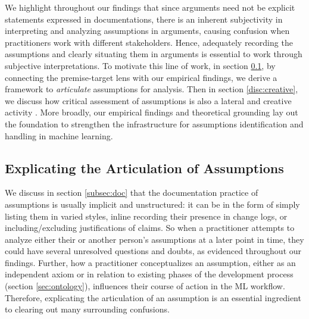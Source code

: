 We highlight throughout our findings that since arguments need not be explicit statements expressed in documentations, there is an inherent subjectivity in interpreting and analyzing assumptions in arguments, causing confusion when practitioners work with different stakeholders. Hence, adequately recording the assumptions and clearly situating them in arguments is essential to work through subjective interpretations. To motivate this line of work, in section \ref{disc:articulate}, by connecting the premise-target lens with our empirical findings, we derive a framework to \textit{articulate} assumptions for analysis. Then in section \ref{disc:creative}, we discuss how critical assessment of assumptions is also a lateral and creative activity \cite{fisher1997critical,delin1994assumption}. More broadly, our empirical findings and theoretical grounding lay out the foundation to strengthen the infrastructure for assumptions identification and handling in machine learning.




\subsection{Explicating the Articulation of Assumptions}
\label{disc:articulate}

We discuss in section \ref{subsec:doc} that the documentation practice of assumptions is usually implicit and unstructured: it can be in the form of simply listing them in varied styles, inline recording their presence in change logs, or including/excluding justifications of claims. So when a practitioner attempts to analyze either their or another person's assumptions at a later point in time, they could have several unresolved questions and doubts, as evidenced throughout our findings. Further, how a practitioner conceptualizes an assumption, either as an independent axiom or in relation to existing phases of the development process (section \ref{sec:ontology}), influences their course of action in the ML workflow.
Therefore, explicating the articulation of an assumption is an essential ingredient to clearing out many surrounding confusions.

